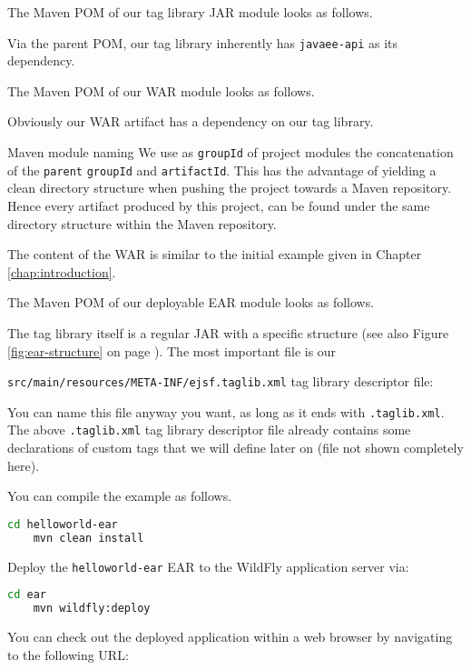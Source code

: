 The Maven POM of our tag library JAR module looks as follows.

Via the parent POM, our tag library inherently has \texttt{javaee-api} as its dependency.

The Maven POM of our WAR module looks as follows.

Obviously our WAR artifact has a dependency on our tag library.
\begin{TIP}{Maven module naming}
	We use as \texttt{groupId} of project modules the concatenation	of the \texttt{parent} \texttt{groupId} and \texttt{artifactId}.
	This has the advantage of yielding a clean directory structure when pushing the project towards a Maven repository.
	Hence every artifact produced by this project, can be found under the same directory structure within the Maven repository.
\end{TIP}

The content of the WAR is similar to the initial example given in Chapter \ref{chap:introduction}.

The Maven POM of our deployable EAR module looks as follows.


The tag library itself is a regular JAR with a specific structure (see also Figure \ref{fig:ear-structure} on page \pageref{fig:ear-structure}).
The most important file is our

\texttt{src/main/resources/META-INF/ejsf.taglib.xml} tag library descriptor file:

You can name this file anyway you want, as long as it ends with \texttt{.taglib.xml}.
The above \texttt{.taglib.xml} tag library descriptor file already contains some declarations of custom tags that we will define later on (file not shown completely here).

You can compile the example as follows.
\begin{lstlisting}[language=bash]
	cd helloworld-ear
	mvn clean install
\end{lstlisting}

Deploy the \texttt{helloworld-ear} EAR to the WildFly application server via:
\begin{lstlisting}[language=bash]
	cd ear
	mvn wildfly:deploy
\end{lstlisting}

You can check out the deployed application within a web browser by navigating to the following URL:

